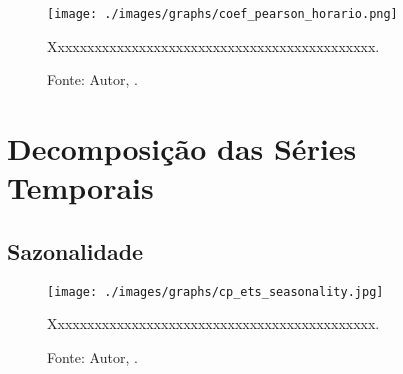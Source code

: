 


\begin{figure}[H]
    \centering
    \texttt{[image: ./images/graphs/coef\_pearson\_horario.png]}
    \caption{Xxxxxxxxxxxxxxxxxxxxxxxxxxxxxxxxxxxxxxxxxxxx.}
    \label{fig:coef_pearson_horario.png}
    \caption*{Fonte: Autor, \imprimirdata.}
\end{figure}




\lipsum[100]



\chapter{Decomposição das Séries Temporais}

\section{Sazonalidade}



\lipsum[100]




\begin{figure}[H]
    \centering
    \texttt{[image: ./images/graphs/cp\_ets\_seasonality.jpg]}
    \caption{Xxxxxxxxxxxxxxxxxxxxxxxxxxxxxxxxxxxxxxxxxxxx.}
    \label{fig:cp_ets_seasonality.jpg}
    \caption*{Fonte: Autor, \imprimirdata.}
\end{figure}



